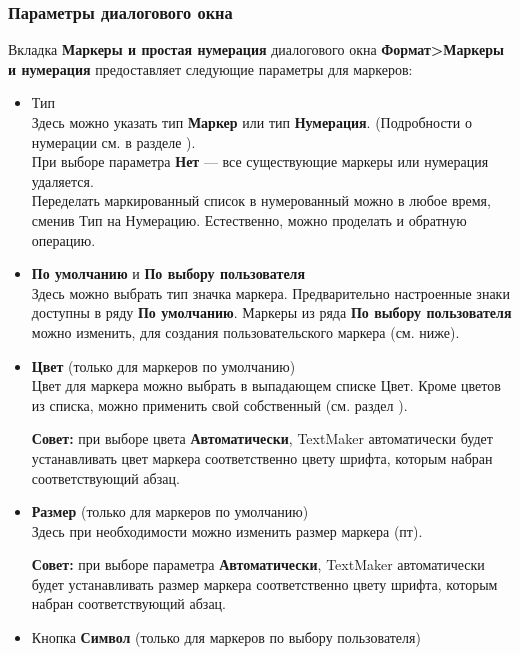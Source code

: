 ﻿\documentclass[a4paper,10pt]{article}
\begin{document}
\subsubsection{Параметры диалогового окна}
Вкладка \textbf{Маркеры и простая нумерация} диалогового окна \textbf{Формат>Маркеры и нумерация} предоставляет следующие параметры для маркеров:
\begin{itemize}
 \item Тип\\
 Здесь можно указать тип \textbf{Маркер} или тип \textbf{Нумерация}. (Подробности о нумерации см. в разделе ).\\
При выборе параметра \textbf{Нет} — все существующие маркеры или нумерация удаляется.\\
Переделать маркированный список в нумерованный можно в любое время, сменив Тип на Нумерацию. Естественно, можно проделать и обратную операцию.
\item \textbf{По умолчанию} и \textbf{По выбору пользователя}\\
Здесь можно выбрать тип значка маркера. Предварительно настроенные знаки доступны в ряду \textbf{По умолчанию}. Маркеры из ряда \textbf{По выбору пользователя} можно изменить, для создания пользовательского маркера (см. ниже).
\item \textbf{Цвет} (только для маркеров по умолчанию)\\
Цвет для маркера можно выбрать в выпадающем списке Цвет. Кроме цветов из списка, можно применить свой собственный (см. раздел ).
\begin{mdframed}[backgroundcolor=blue!10]
\textbf{Совет:} при выборе цвета \textbf{Автоматически}, TextMaker автоматически будет устанавливать цвет маркера соответственно цвету шрифта, которым набран соответствующий абзац.
\end{mdframed}
\item \textbf{Размер} (только для маркеров по умолчанию)\\
Здесь при необходимости можно изменить размер маркера (пт).
\begin{mdframed}[backgroundcolor=blue!10]
\textbf{Совет:} при выборе параметра \textbf{Автоматически}, TextMaker автоматически будет устанавливать размер маркера соответственно цвету шрифта, которым набран соответствующий абзац.
\end{mdframed}
\item Кнопка \textbf{Символ} (только для маркеров по выбору пользователя)\\

\end{itemize}
\end{document}
